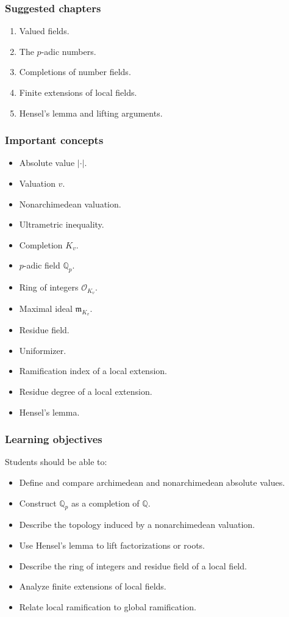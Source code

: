\documentclass[11pt]{article}
\begin{document}
\subsubsection*{Suggested chapters}

\begin{enumerate}
    \item Valued fields.
    \item The \(p\)-adic numbers.
    \item Completions of number fields.
    \item Finite extensions of local fields.
    \item Hensel's lemma and lifting arguments.
\end{enumerate}

\subsubsection*{Important concepts}

\begin{itemize}
    \item Absolute value \(|\cdot|\).
    \item Valuation \(v\).
    \item Nonarchimedean valuation.
    \item Ultrametric inequality.
    \item Completion \(K_v\).
    \item \(p\)-adic field \(\mathbb{Q}_p\).
    \item Ring of integers \(\mathcal{O}_{K_v}\).
    \item Maximal ideal \(\mathfrak{m}_{K_v}\).
    \item Residue field.
    \item Uniformizer.
    \item Ramification index of a local extension.
    \item Residue degree of a local extension.
    \item Hensel's lemma.
\end{itemize}

\subsubsection*{Learning objectives}

Students should be able to:

\begin{itemize}
    \item Define and compare archimedean and nonarchimedean absolute values.
    \item Construct \(\mathbb{Q}_p\) as a completion of \(\mathbb{Q}\).
    \item Describe the topology induced by a nonarchimedean valuation.
    \item Use Hensel's lemma to lift factorizations or roots.
    \item Describe the ring of integers and residue field of a local field.
    \item Analyze finite extensions of local fields.
    \item Relate local ramification to global ramification.
\end{itemize}
\end{document}
